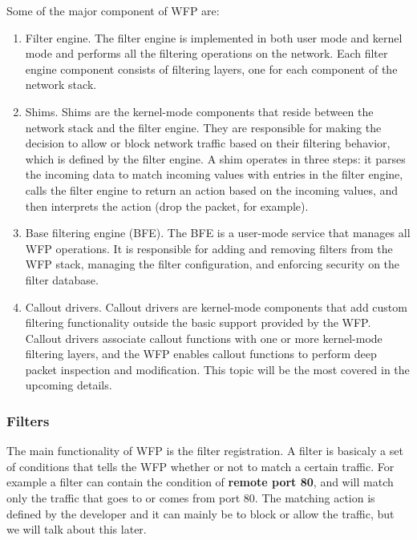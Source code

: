 Some of the major component of WFP are:
\begin{enumerate}

\item Filter engine. The filter engine is implemented in both user mode and kernel mode and performs all the filtering operations on the network. Each filter engine component consists of
filtering layers, one for each component of the network stack.

\item Shims. Shims are the kernel-mode components that reside between the network stack and the filter engine. They are responsible for making the decision to allow or block network traffic
based on their filtering behavior, which is defined by the filter engine. A shim operates in three steps: it parses the incoming data to match incoming values with entries in the filter engine,
calls the filter engine to return an action based on the incoming values, and then interprets the action (drop the packet, for example).

\item Base filtering engine (BFE). The BFE is a user-mode service that manages all WFP operations. It is responsible for adding and removing filters from the WFP stack, managing the filter 
configuration, and enforcing security on the filter database.

\item Callout drivers. Callout drivers are kernel-mode components that add custom filtering functionality outside the basic support provided by the WFP. Callout drivers associate callout 
functions with one or more kernel-mode filtering layers, and the WFP enables callout functions to perform deep packet inspection and modification. This topic will be the most covered in the
upcoming details.

\end{enumerate}

\subsubsection{Filters}

The main functionality of WFP is the filter registration. A filter is basicaly a set of conditions that tells the WFP whether or not to match a certain traffic. For example a filter can contain the condition of \textbf{remote port 80}, and will match only the traffic that goes to or comes from port 80. The matching action is defined by the developer and it can mainly be to block or allow the traffic, but we will talk about this later.

